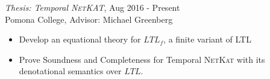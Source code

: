 {\sl Thesis: Temporal \textsc{NetKAT}}, \hfill  Aug 2016 - Present \\
Pomona College, Advisor: Michael Greenberg
\begin{itemize} \itemsep -2pt
  \item Develop an equational theory for $LTL_f$, a finite variant of LTL
  \item Prove Soundness and Completeness for Temporal \textsc{NetKat} with its
    denotational semantics over $LTL$.
\end{itemize}
